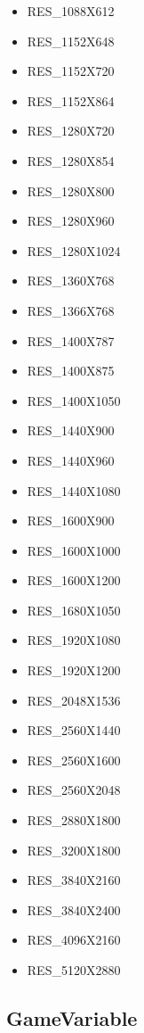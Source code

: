 \begin{itemize}
    \item RES\_1088X612
    \item RES\_1152X648
    \item RES\_1152X720
    \item RES\_1152X864
    \item RES\_1280X720
    \item RES\_1280X854
    \item RES\_1280X800
    \item RES\_1280X960
    \item RES\_1280X1024
    \item RES\_1360X768
    \item RES\_1366X768
    \item RES\_1400X787
    \item RES\_1400X875
    \item RES\_1400X1050
    \item RES\_1440X900
    \item RES\_1440X960
    \item RES\_1440X1080
    \item RES\_1600X900
    \item RES\_1600X1000
    \item RES\_1600X1200
    \item RES\_1680X1050
    \item RES\_1920X1080
    \item RES\_1920X1200
    \item RES\_2048X1536
    \item RES\_2560X1440
    \item RES\_2560X1600
    \item RES\_2560X2048
    \item RES\_2880X1800
    \item RES\_3200X1800
    \item RES\_3840X2160
    \item RES\_3840X2400
    \item RES\_4096X2160
    \item RES\_5120X2880
\end{itemize}

\subsection{GameVariable} \label{subsec:gamevar}


